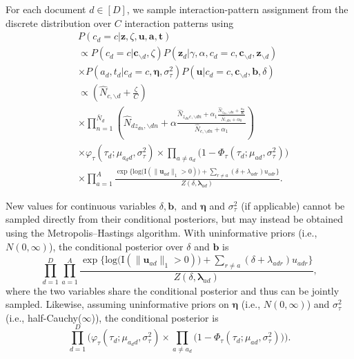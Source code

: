 \documentclass{article}
\begin{document}
For each document $d \in [D]$, we sample interaction-pattern assignment from the discrete distribution over $C$ interaction patterns using 
\begin{equation}
\begin{aligned}
&P(c_d = c|\boldsymbol{z}, \zeta, \boldsymbol{u},\boldsymbol{a}, \boldsymbol{t})
\\&\propto P(c_d=c|\boldsymbol{c}_{\backslash d}, \zeta) P(\boldsymbol{z}_d|\gamma, \alpha, c_d=c, \boldsymbol{c}_{\backslash d}, \boldsymbol{z}_{\backslash d})\\&\times P(a_d, t_d|c_d = c, \boldsymbol{\eta}, \sigma_\tau^2) P(\boldsymbol{u}|c_d=c, \boldsymbol{c}_{\backslash d}, \boldsymbol{b}, \delta) 
\\&\propto (\hat N_{c, \backslash d}+\frac{\zeta}{C}) \\&
\times\prod_{n=1}^{\bar N_d} (\hat N_{dz_{dn}, \backslash dn}+\alpha \frac{\hat N_{z_{dn}c,\backslash dn}+\alpha_1\frac{\hat N_{z_{dn}, \backslash dn}+\frac{\alpha_0}{K}}{\hat N_{\backslash dn}+\alpha_0}}{\hat N_{c, \backslash dn}+\alpha_1})\\&\times
\varphi_{\tau}(\tau_{d}; \mu_{a_d d}, \sigma_\tau^2)\times \prod_{a\neq a_d}\big(1-\Phi_{\tau}(\tau_{d}; \mu_{a d}, \sigma_\tau^2) \big)\\& 
\times
\prod_{a=1}^A \frac{\exp\Big\{\mbox{log}\big(\text{I}( \lVert \boldsymbol{u}_{ad}\rVert_1 > 0)\big) + \sum\limits_{r \neq a} (\delta+\lambda_{adr})u_{adr}\Big\}}{Z(\delta,\boldsymbol{\lambda}_{ad})}.
\end{aligned}
\end{equation}

New values for continuous variables $\delta, \boldsymbol{b},$ and $\boldsymbol{\eta}$ and $\sigma^2_\tau$ (if applicable) cannot be sampled directly from their conditional posteriors, but may instead be obtained using the Metropolis--Hastings algorithm. With uninformative priors (i.e., $N({0},\infty)$), the conditional posterior over $\delta$ and $\boldsymbol{b}$ is
\begin{equation}
 	   \prod_{d=1}^D
 	   \prod_{a=1}^A \frac{\exp\Big\{\mbox{log}\big(\text{I}( \lVert \boldsymbol{u}_{ad}\rVert_1 > 0)\big) + \sum\limits_{r \neq a} (\delta+\lambda_{adr})u_{adr}\Big\}}{Z(\delta,\boldsymbol{\lambda}_{ad})},
 	   \end{equation}
 	   where the two variables share the conditional posterior and thus can be jointly sampled. Likewise, assuming uninformative priors on $\boldsymbol{\eta}$ (i.e., $N({0},\infty)$) and $\sigma_{\tau}^2$ (i.e., half-Cauchy($\infty$)), the conditional posterior is
 	   \begin{equation}
 	   \prod_{d=1}^D\Big(\varphi_{\tau}(\tau_{d}; \mu_{a_d d}, \sigma_\tau^2)\times \prod_{a\neq a_d}\big(1-\Phi_{\tau}(\tau_{d}; \mu_{a d}, \sigma_\tau^2) \big)\Big).
 	   \end{equation}
 	   
\end{document}
